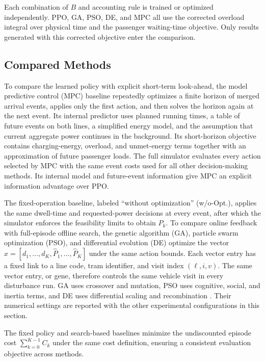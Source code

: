 \documentclass[conference]{IEEEtran}
\begin{document}
Each combination of $B$ and accounting rule is trained or optimized independently. PPO, GA, PSO, DE, and MPC all use the corrected overload integral over physical time and the passenger waiting-time objective. Only results generated with this corrected objective enter the comparison.

\subsection{Compared Methods}
To compare the learned policy with explicit short-term look-ahead, the model predictive control (MPC) baseline repeatedly optimizes a finite horizon of merged arrival events, applies only the first action, and then solves the horizon again at the next event. Its internal predictor uses planned running times, a table of future events on both lines, a simplified energy model, and the assumption that current aggregate power continues in the background. Its short-horizon objective contains charging-energy, overload, and unmet-energy terms together with an approximation of future passenger loads. The full simulator evaluates every action selected by MPC with the same event costs used for all other decision-making methods. Its internal model and future-event information give MPC an explicit information advantage over PPO.

The fixed-operation baseline, labeled ``without optimization'' (w/o-Opt.), applies the same dwell-time and requested-power decisions at every event, after which the simulator enforces the feasibility limits to obtain $P_k$. To compare online feedback with full-episode offline search, the genetic algorithm (GA), particle swarm optimization (PSO), and differential evolution (DE) optimize the vector $x=[d_1,\ldots,d_K,\widehat{P}_1,\ldots,\widehat{P}_K]$ under the same action bounds. Each vector entry has a fixed link to a line code, tram identifier, and visit index $(\ell,i,v)$. The same vector entry, or gene, therefore controls the same vehicle visit in every disturbance run. GA uses crossover and mutation, PSO uses cognitive, social, and inertia terms, and DE uses differential scaling and recombination \cite{holland1975adaptation,kennedy1995pso,storn1997de}. Their numerical settings are reported with the other experimental configurations in this section.

The fixed policy and search-based baselines minimize the undiscounted episode cost $\sum_{k=0}^{K-1}C_k$ under the same cost definition, ensuring a consistent evaluation objective across methods.
\end{document}
